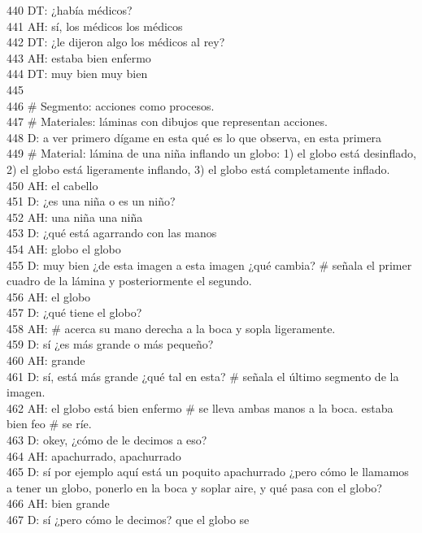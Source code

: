 440 DT: ¿había médicos?\\
441 AH: sí, los médicos los médicos\\
442 DT: ¿le dijeron algo los médicos al rey?\\
443 AH: estaba bien enfermo\\
444 DT: muy bien muy bien\\
445 \\
446 \# Segmento: acciones como procesos.\\
447 \# Materiales: láminas con dibujos que representan acciones.\\
448 D: a ver primero dígame en esta qué es lo que observa, en esta primera\\
449 \# Material: lámina de una niña inflando un globo: 1) el globo está desinflado, 2) el globo está ligeramente inflando, 3) el globo está completamente inflado.\\
450 AH: el cabello\\
451 D: ¿es una niña o es un niño?\\
452 AH: una niña una niña\\
453 D: ¿qué está agarrando con las manos\\
454 AH: globo el globo\\
455 D: muy bien ¿de esta imagen a esta imagen ¿qué cambia? \# señala el primer cuadro de la lámina y posteriormente el segundo.\\
456 AH: el globo\\
457 D: ¿qué tiene el globo?\\
458 AH: \# acerca su mano derecha a la boca y sopla ligeramente.\\
459 D: sí ¿es más grande o más pequeño?\\
460 AH: grande\\
461 D: sí, está más grande ¿qué tal en esta? \# señala el último segmento de la imagen.\\
462 AH: el globo está bien enfermo \# se lleva ambas manos a la boca. estaba bien feo \# se ríe.\\
463 D: okey, ¿cómo de le decimos a eso?\\
464 AH: apachurrado, apachurrado\\
465 D: sí por ejemplo aquí está un poquito apachurrado ¿pero cómo le llamamos a tener un globo, ponerlo en la boca y soplar aire, y qué pasa con el globo?\\
466 AH: bien grande\\
467 D: sí ¿pero cómo le decimos? que el globo se\\
